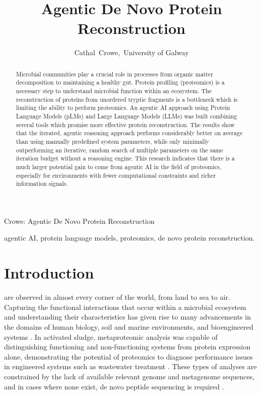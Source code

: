 \documentclass[journal]{IEEEtran}
\begin{document}
\raggedbottom

\title{Agentic De Novo Protein Reconstruction}
\author{Cathal~Crowe,~University of Galway}

%
{Crowe: Agentic De Novo Protein Reconstruction}

\maketitle

\begin{abstract}
Microbial communities play a crucial role in processes from organic matter decomposition to maintaining a healthy gut.
Protein profiling (proteomics) is a necessary step to understand microbial function within an ecosystem. The reconstruction
of proteins from unordered tryptic fragments is a bottleneck which is limiting the ability to perform proteomics.
An agentic AI approach using Protein Language Models (pLMs) and Large Language Models (LLMs) was built combining several
tools which promise more effective protein reconstruction. The results show that the iterated, agentic
reasoning approach performs considerably better on average than using manually predefined system parameters, while only
minimally outperforming an iterative, random search of multiple parameters on the same iteration budget without a reasoning engine. 
This research indicates that there is a much larger potential gain to come from agentic AI in the field of proteomics, especially for environments with fewer
computational constraints and richer information signals.
\end{abstract}

\begin{IEEEkeywords}
agentic AI, protein language models, proteomics, de novo protein reconstruction.
\end{IEEEkeywords}

\IEEEpeerreviewmaketitle

\section{Introduction}
 are observed in almost every corner of the world, from land to sea to air.
Capturing the functional interactions that occur within a microbial ecosystem and understanding their characteristics
has given rise to many advancements in the domains of human biology, soil and marine environments, and bioengineered systems \cite{10.1111/j.1574-6941.2011.01284.x}.
In activated sludge, metaproteomic analysis was capable of distinguishing functioning and non-functioning systems from protein expression alone, demonstrating the potential
of proteomics to diagnose performance issues in engineered systems such as wastewater treatment \cite{10.1111/j.1574-6941.2011.01284.x}.
These types of analyses are constrained by the lack of available relevant genome and metagenome sequences, and in cases where none exist, de novo peptide sequencing
is required \cite{10.1111/j.1574-6941.2011.01284.x}.
\end{document}
